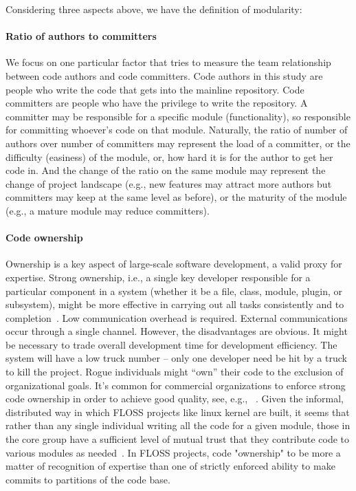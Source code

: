 \documentclass{sig-alternate-05-2015}
\begin{document}
Considering three aspects above, we have the definition of modularity:


\paragraph{Ratio of authors to committers}
We focus on one particular factor that tries to measure the team relationship between
code authors and code committers. Code authors in this study are people who
write the code that gets into the mainline repository. Code committers are
people who have the privilege to write the repository. A committer may be
responsible for a specific module (functionality), so responsible for committing
whoever's code on that module. 
Naturally, the ratio of number of authors over number of committers may represent the load of a committer, or the difficulty (easiness) of the module, or, how hard it is for the author to 
get her code in. And the change of the ratio on the same module may represent
the change of project landscape (e.g., new features may attract more authors but
committers may keep at the same level as before), or the maturity of the module (e.g.,
a mature module may reduce committers). 

\paragraph{Code ownership}
Ownership is a key aspect of large-scale software development,
 a valid proxy for expertise. Strong ownership, i.e., 
 a single key developer responsible for a particular component in a system (whether
it be a file, class, module, plugin, or subsystem), might be more
effective in carrying out all tasks consistently
and to completion~\cite{nordberg03}.
 Low communication overhead is required. External communications occur
through a single channel.
However, the disadvantages are obvious.
It might be necessary to trade overall development time for development
efficiency.  The system will have a low truck number -- only one developer 
need be hit by a truck to kill the project.
 Rogue individuals might ``own'' their code
to the exclusion of organizational goals.
It's common for commercial organizations to enforce strong code
ownership in order to achieve good quality, see, e.g., ~\cite{bird11}.
Given the informal, distributed way in which FLOSS projects like linux kernel are built, 
it seems that rather than
any single individual writing all the code for a given module, those in the core group
have a sufficient level of mutual trust that they contribute code to various modules as
needed~\cite{MFH02}. In FLOSS projects, code "ownership" to be
more a matter of recognition of expertise than one of strictly enforced ability to make
commits to partitions of the code base.
\end{document}
